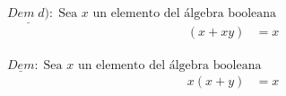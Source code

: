 \begin{multicols}{2}
	\noindent
	$\underline{Dem \;d)}:\; \text{Sea $x$ un elemento del álgebra booleana}$
	\begin{align*}
		(x+xy) & =x \\
	\end{align*}

	\columnbreak

	\noindent
	$\underline{Dem}:\; \text{Sea $x$ un elemento del álgebra booleana}$
	\begin{align*}
		x(x+y) & =x \\
	\end{align*}
\end{multicols}
